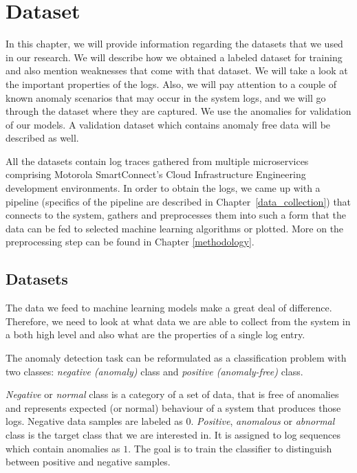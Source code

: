 \chapter{Dataset}
\label{chapter:dataset}

In this chapter, we will provide information regarding the datasets that we used in our research. We will describe how we obtained a labeled dataset for training and also mention weaknesses that come with that dataset. We will take a look at the important properties of the logs. 
Also, we will pay attention to a couple of known anomaly scenarios that may occur in the system logs, and we will go through the dataset where they are captured. 
We use the anomalies for validation of our models. A validation dataset which contains anomaly free data will be described as well. 

All the datasets contain log traces gathered from multiple microservices comprising Motorola SmartConnect's Cloud Infrastructure Engineering development environments.
In order to obtain the logs, we came up with a pipeline (specifics of the pipeline are described in Chapter~\ref{data_collection}) that connects to the system, gathers and preprocesses them into such a form that the data can be fed to selected machine learning algorithms or plotted.
More on the preprocessing step can be found in Chapter \ref{methodology}.

\section{Datasets}
\label{dataset}
The data we feed to machine learning models make a great deal of difference. Therefore, we need to look at what data we are able to collect from the system in a both high level and also what are the properties of a single log entry.

The anomaly detection task can be reformulated as a classification problem with two classes: \textit{negative (anomaly)} class and \textit{positive (anomaly-free)} class. 

\textit{Negative} or \textit{normal} class is a category of a set of data, that is free of anomalies and represents expected (or normal) behaviour of a system that produces those logs. Negative data samples are labeled as $0$. \textit{Positive}, \textit{anomalous} or \textit{abnormal} class is the target class that we are interested in. It is assigned to log sequences which contain anomalies as $1$. The goal is to train the classifier to distinguish between positive and negative samples.

